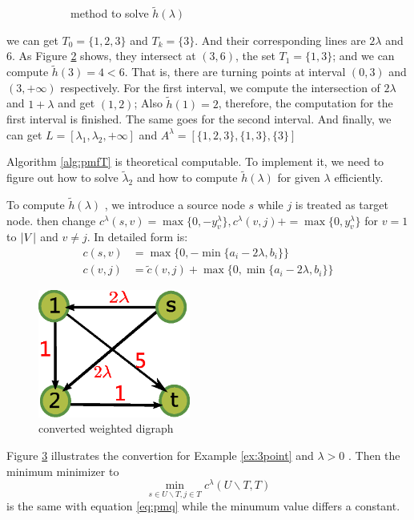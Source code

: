 \documentclass{article}
\begin{document}
\begin{example}
\begin{figure}[!ht]
\begin{subfigure}{0.45\textwidth}
\caption{method to solve $\tilde{h}(\lambda)$}\label{fig:linseg}
\end{subfigure}
\caption{}
\end{figure}
we can get $T_0 = \{1,2,3\} $ and $T_k = \{3\}$. And their corresponding lines are $2\lambda$ and $6$. As Figure \ref{fig:linseg} shows, they intersect at $(3,6)$, the set $T_1=\{1,3\}$; and we can compute $\tilde{h}(3) = 4 < 6$. That is, there are turning points at interval $(0, 3)$ and $(3, +\infty)$ respectively. For the first interval, we compute the intersection of $2\lambda$ and $1+\lambda$ and get $(1,2)$; Also $\tilde{h}(1)=2$, therefore, the computation for the first interval is finished. The same goes for the second interval. And finally, we can get $L=[\lambda_1, \lambda_2, +\infty]$ and $A^{\lambda} = [\{1,2,3\}, \{1,3\},\{3\}]$
\end{example}

Algorithm \ref{alg:pmfT} is theoretical computable. To implement it, we need to figure out how to solve $\tilde{\lambda}_2$ and how to compute $\tilde{h}(\lambda)$ for given $\lambda$ efficiently.

To compute $\tilde{h}(\lambda)$ , we introduce a source node $s$ while $j$ is treated as target node.  then change
$c^{\lambda}(s,v)=\max\{0, -y^{\lambda}_v\}, c^{\lambda}(v,j) += \max\{0, y^{\lambda}_v\}$ for $ v=1 $ to $\lvert V\rvert$ and $v \neq  j$.
In detailed form is:
\begin{align}
c(s, v) &=  \max\{0, -\min\{a_i-2\lambda, b_i\}\} \\
c(v, j) & = \tilde{c}(v, j) + \max\{0, \min\{a_i - 2\lambda, b_i\}\}
\end{align}
\begin{figure}
\centering
\includegraphics[width=5cm]{pic/example_st.eps}
\caption{converted weighted digraph}\label{fig:convert}
\end{figure}
Figure \ref{fig:convert} illustrates the convertion for Example \ref{ex:3point} and $\lambda>0$ .
Then the minimum minimizer to 
\begin{equation}\label{eq:pmqe}
\min_{s\in U\backslash T, j\in T}c^{\lambda}(U\backslash T, T)
\end{equation}
is the same with equation \eqref{eq:pmq} while the minumum value differs a constant.
\end{document}
